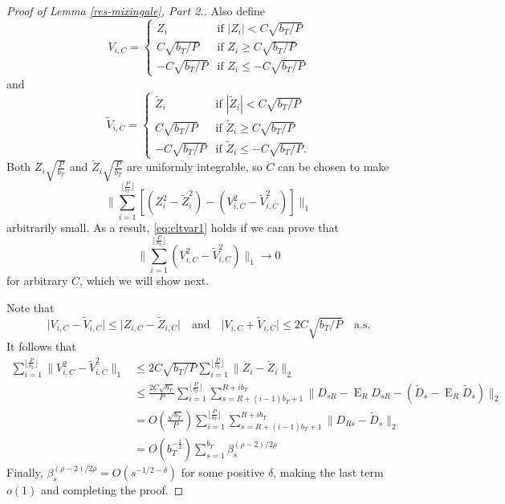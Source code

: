 \documentclass[11pt]{article}
\DeclareMathOperator{\E}{E}
\newcommand{\InnerBlockL}[1]{\ensuremath{R+(#1-1)b_T + 1}}
\newcommand{\InnerBlockU}[1]{\ensuremath{R+#1 b_T}}
\newcommand{\OuterBlockU}{\lfloor \frac P{b_T} \rfloor}
\newcommand{\SumOuterBlock}[1]{\ensuremath{\sum_{#1=1}^{\OuterBlockU}}}
\newcommand{\SumInnerBlock}[2]{\ensuremath{\sum_{#1=\InnerBlockL{#2}}^{\InnerBlockU{#2}}}}
\newcommand{\ZSummand}{D_{sR} - \E_R D_{sR}}
\newcommand{\ZTrunc}{\ensuremath{C\sqrt{b_{T}/P}}}
\newcommand{\couplingBeta}[1]{\ensuremath{\beta^{(\rho-2)/2\rho}_{#1}}}
\begin{document}
\begin{proof}[Proof of Lemma \ref{res-mixingale}, Part 2.]
Also define 
\[
V_{i,C} = \begin{cases} Z_i & \text{if } |Z_i| < \ZTrunc \\ 
  \ZTrunc & \text{if } Z_i \geq \ZTrunc \\
- \ZTrunc & \text{if } Z_i \leq -\ZTrunc
  \end{cases}
\]
and
\[
\tilde V_{i,C} = \begin{cases} 
 \tilde Z_i & \text{if } |\tilde Z_i| < \ZTrunc \\ 
  \ZTrunc & \text{if } \tilde Z_i \geq \ZTrunc \\
- \ZTrunc & \text{if } \tilde Z_i \leq -\ZTrunc.
\end{cases} 
\]
Both $Z_i\sqrt{\frac{P}{b_T}}$ and $\tilde Z_i\sqrt{\frac{P}{b_T}}$
are uniformly integrable, so $C$ can be chosen to make
\[
\lVert \SumOuterBlock{i} [(Z_i^2 - \tilde Z_i^2) - (V_{i,C}^2 - \tilde V_{i,C}^2)] \rVert_1
\]
arbitrarily small.  As a result, \eqref{eq:cltvar1} holds if we can
prove that
\[
\lVert \SumOuterBlock{i} (V_{i,C}^2 - \tilde V_{i,C}^2) \rVert_1 \to 0
\]
for arbitrary $C$, which we will show next.

Note that 
\[\lvert V_{i,C} - \tilde V_{i,C} \rvert \leq \lvert Z_{i,C} - \tilde
Z_{i,C} \rvert \quad \text{and} \quad \lvert V_{i,C} + \tilde V_{i,C}
\rvert \leq 2 C \sqrt{b_T/P} \quad \text{a.s.}\] 
It follows that
\begin{align*}
  \SumOuterBlock{i} \lVert V_{i,C}^2 - \tilde V_{i,C}^2 \rVert_1 &
  \leq 2 \ZTrunc \SumOuterBlock{i} \lVert Z_i - \tilde Z_i \rVert_2 \\
  & \leq \frac{2 C \sqrt{b_T}}{P}\SumOuterBlock{i} \SumInnerBlock{s}{i} \lVert \ZSummand
  - (\tilde D_s - \E_R \tilde D_s) \rVert_2 \\
  & = O(\frac{\sqrt{b_T}}{P}) \SumOuterBlock{i} \SumInnerBlock{s}{i} \lVert D_{Rs} - \tilde D_s \rVert_2 \\
  & = O(b_T^{-\frac12}) \sum_{s=1}^{b_T} \couplingBeta{s} 
\end{align*}
Finally, $\couplingBeta{s} = O(s^{-1/2-\delta})$ for some positive
$\delta$, making the last term $o(1)$ and completing the proof.
\end{proof}
\end{document}
